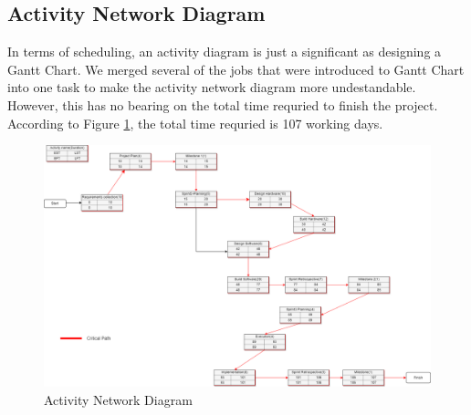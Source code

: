         \subsection{Activity Network Diagram}

            In terms of scheduling, an activity diagram is just a significant as designing a Gantt Chart. We merged several of
            the jobs that were introduced to Gantt Chart into one task to make the activity network diagram more undestandable.
            However, this has no bearing on the total time requried to finish the project. According to Figure
            \ref{fig:activity_network_diagram}, the total time requried is 107 working days.

            \begin{figure}[H]
              \includegraphics[width=\linewidth]{graphics/AND.drawio.png}
              \caption{Activity Network Diagram}
              \label{fig:activity_network_diagram}
            \end{figure}
